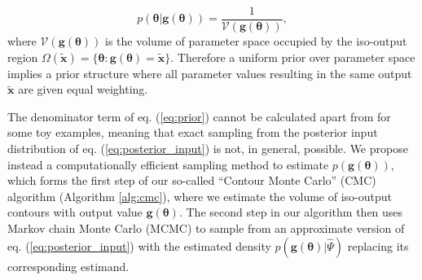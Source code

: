 \documentclass[10pt,letterpaper]{article}
\begin{document}
%
\begin{equation}\label{eq:contour_volume}
p(\boldsymbol{\theta}|\boldsymbol{g}(\boldsymbol{\theta})) = \frac{1}{\mathcal{V}(\boldsymbol{g}(\boldsymbol{\theta}))},
\end{equation}
%
where $\mathcal{V}(\boldsymbol{g}(\boldsymbol{\theta}))$ is the volume of parameter space occupied by the iso-output region $\Omega(\tilde{\boldsymbol{x}}) = \{\boldsymbol{\theta}: \boldsymbol{g}(\boldsymbol{\theta}) = \tilde{\boldsymbol{x}}\}$. Therefore a uniform prior over parameter space implies a prior structure where all  parameter values resulting in the same output $\tilde{\boldsymbol{x}}$ are given equal weighting.

The denominator term of eq. (\ref{eq:prior}) cannot be calculated apart from for some toy examples, meaning that exact sampling from the posterior input distribution of eq. (\ref{eq:posterior_input}) is not, in general, possible. We propose instead a computationally efficient sampling method to estimate $p(\boldsymbol{g}(\boldsymbol{\theta}))$, which forms the first step of our so-called ``Contour Monte Carlo'' (CMC) algorithm (Algorithm \ref{alg:cmc}), where we estimate the volume of iso-output contours with output value $\boldsymbol{g}(\boldsymbol{\theta})$. The second step in our algorithm then uses Markov chain Monte Carlo (MCMC) to sample from an approximate version of eq. (\ref{eq:posterior_input}) with the estimated density $p(\boldsymbol{g}(\boldsymbol{\theta})|\hat{\Psi})$ replacing its corresponding estimand.
\end{document}
